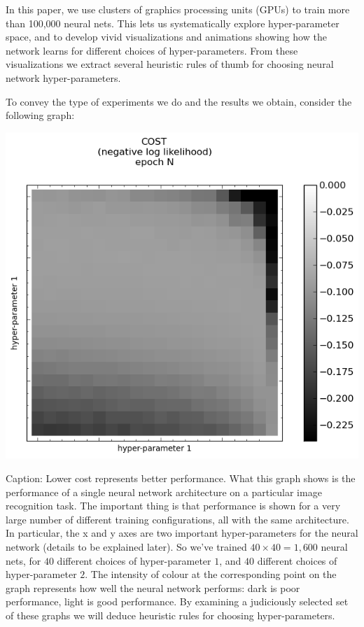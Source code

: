 \documentclass[10pt]{article}
\begin{document}
%
%
In this paper, we use clusters of graphics processing units (GPUs) to
train more than 100,000 neural nets.  This lets us systematically
explore hyper-parameter space, and to develop vivid visualizations and
animations showing how the network learns for different choices of
hyper-parameters.  From these visualizations we extract several
heuristic rules of thumb for choosing neural network hyper-parameters.

%
%
To convey the type of experiments we do and the results we obtain,
consider the following graph:
%
\begin{center}
\includegraphics[scale=0.5]{plots/example.png}
\end{center}


Caption: Lower cost represents better performance.
%
What this graph shows is the performance of a single neural network
architecture on a particular image recognition task.  The important
thing is that performance is shown for a very large number of
different training configurations, all with the same architecture.  In
particular, the x and y axes are two important hyper-parameters for
the neural network (details to be explained later).  So we've trained
$40 \times 40 = 1,600$ neural nets, for $40$ different choices of
hyper-parameter $1$, and $40$ different choices of hyper-parameter
$2$.  The intensity of colour at the corresponding point on the graph
represents how well the neural network performs: dark is poor
performance, light is good performance.  By examining a judiciously
selected set of these graphs we will deduce heuristic rules for
choosing hyper-parameters.
\end{document}

